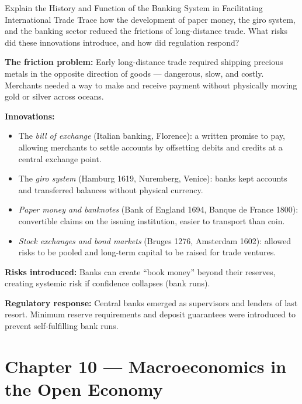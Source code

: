 \documentclass[paper=a5]{scrartcl}
\begin{document}
\begin{question}[type=open]{Explain the History and Function of the Banking System
  in Facilitating International Trade}
Trace how the development of paper money, the giro system, and the banking
sector reduced the frictions of long-distance trade. What risks did these
innovations introduce, and how did regulation respond?

\answerlines[7]

\begin{solution}
  \textbf{The friction problem:} Early long-distance trade required shipping
  precious metals in the opposite direction of goods --- dangerous, slow, and
  costly. Merchants needed a way to make and receive payment without physically
  moving gold or silver across oceans.

  \textbf{Innovations:}
  \begin{itemize}
    \item The \emph{bill of exchange} (Italian banking, Florence): a written
      promise to pay, allowing merchants to settle accounts by offsetting
      debits and credits at a central exchange point.
    \item The \emph{giro system} (Hamburg 1619, Nuremberg, Venice): banks
      kept accounts and transferred balances without physical currency.
    \item \emph{Paper money and banknotes} (Bank of England 1694, Banque de
      France 1800): convertible claims on the issuing institution, easier
      to transport than coin.
    \item \emph{Stock exchanges and bond markets} (Bruges 1276, Amsterdam
      1602): allowed risks to be pooled and long-term capital to be raised
      for trade ventures.
  \end{itemize}

  \textbf{Risks introduced:} Banks can create ``book money'' beyond their
  reserves, creating systemic risk if confidence collapses (bank runs).

  \textbf{Regulatory response:} Central banks emerged as supervisors and
  lenders of last resort. Minimum reserve requirements and deposit guarantees
  were introduced to prevent self-fulfilling bank runs.
\end{solution}
\end{question}


\section{Chapter 10 — Macroeconomics in the Open Economy}
\end{document}
